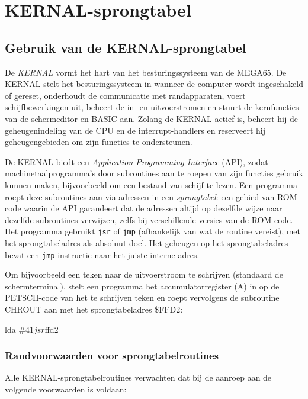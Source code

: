 \chapter{KERNAL-sprongtabel}
\label{cha:kernal-jump-table}

\section{Gebruik van de KERNAL-sprongtabel}

De \emph{KERNAL} vormt het hart van het besturingssysteem van de MEGA65. De KERNAL stelt het besturingssysteem in wanneer de computer wordt ingeschakeld of gereset, onderhoudt de communicatie met randapparaten, voert schijfbewerkingen uit, beheert de in- en uitvoerstromen en stuurt de kernfuncties van de schermeditor en BASIC aan. Zolang de KERNAL actief is, beheert hij de geheugenindeling van de CPU en de interrupt-handlers en reserveert hij geheugengebieden om zijn functies te ondersteunen.

De KERNAL biedt een \emph{Application Programming Interface} (API), zodat machinetaalprogramma's door subroutines aan te roepen van zijn functies gebruik kunnen maken, bijvoorbeeld om een bestand van schijf te lezen. Een programma roept deze subroutines aan via adressen in een \emph{sprongtabel}: een gebied van ROM-code waarin de API garandeert dat de adressen altijd op dezelfde wijze naar dezelfde subroutines verwijzen, zelfs bij verschillende versies van de ROM-code. Het programma gebruikt \texttt{jsr} of \texttt{jmp} (afhankelijk van wat de routine vereist), met het sprongtabeladres als absoluut doel. Het geheugen op het sprongtabeladres bevat een \texttt{jmp}-instructie naar het juiste interne adres.

Om bijvoorbeeld een teken naar de uitvoerstroom te schrijven (standaard de schermterminal), stelt een programma het accumulatorregister (A) in op de PETSCII-code van het te schrijven teken en roept vervolgens de subroutine CHROUT aan met het sprongtabeladres \$FFD2:

\begin{asmcode}
    lda #$41
    jsr $ffd2
\end{asmcode}

\subsection{Randvoorwaarden voor sprongtabelroutines}

Alle KERNAL-sprongtabelroutines verwachten dat bij de aanroep aan de volgende voorwaarden is voldaan:

